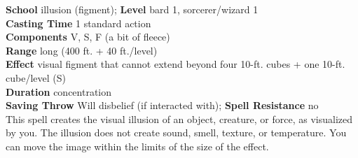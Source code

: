 \textbf{School} illusion (figment); \textbf{Level} bard 1, sorcerer/wizard 1\\
\textbf{Casting Time} 1 standard action\\
\textbf{Components} V, S, F (a bit of fleece)\\
\textbf{Range} long (400 ft. + 40 ft./level)\\
\textbf{Effect} visual figment that cannot extend beyond four 10-ft. cubes + one 10-ft. cube/level (S)\\
\textbf{Duration} concentration\\
\textbf{Saving Throw }Will disbelief (if interacted with); \textbf{Spell Resistance} no\\
This spell creates the visual illusion of an object, creature, or force, as visualized by you. The illusion does not create sound, smell, texture, or temperature. You can move the image within the limits of the size of the effect.\\
